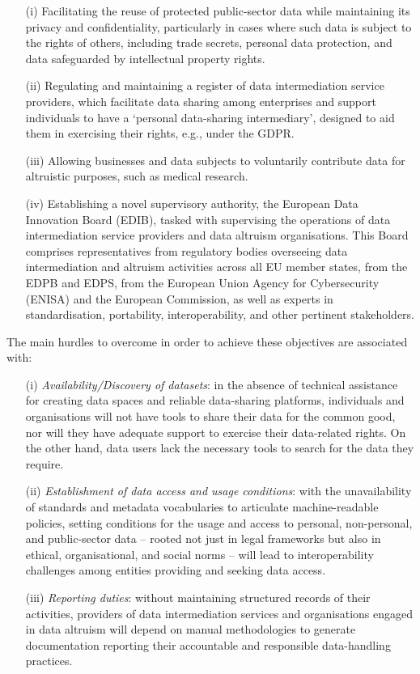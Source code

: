 \begin{enumerate}
    \item[(i)] Facilitating the reuse of protected public-sector data while maintaining its privacy and confidentiality, particularly in cases where such data is subject to the rights of others, including trade secrets, personal data protection, and data safeguarded by intellectual property rights.
    \item[(ii)] Regulating and maintaining a register of data intermediation service providers, which facilitate data sharing among enterprises and support individuals to have a `personal data-sharing intermediary', designed to aid them in exercising their rights, e.g., under the GDPR.
    \item[(iii)] Allowing businesses and data subjects to voluntarily contribute data for altruistic purposes, such as medical research.
    \item[(iv)] Establishing a novel supervisory authority, the European Data Innovation Board (EDIB), tasked with supervising the operations of data intermediation service providers and data altruism organisations.
    This Board comprises representatives from regulatory bodies overseeing data intermediation and altruism activities across all EU member states, from the EDPB and EDPS, from the European Union Agency for Cybersecurity (ENISA) and the European Commission, as well as experts in standardisation, portability, interoperability, and other pertinent stakeholders.
\end{enumerate}

The main hurdles to overcome in order to achieve these objectives are associated with:

\begin{enumerate}
    \item[(i)] \textit{Availability/Discovery of datasets}: in the absence of technical assistance for creating data spaces and reliable data-sharing platforms, individuals and organisations will not have tools to share their data for the common good, nor will they have adequate support to exercise their data-related rights. On the other hand, data users lack the necessary tools to search for the data they require.
    \item[(ii)] \textit{Establishment of data access and usage conditions}: with the unavailability of standards and metadata vocabularies to articulate machine-readable policies, setting conditions for the usage and access to personal, non-personal, and public-sector data -- rooted not just in legal frameworks but also in ethical, organisational, and social norms -- will lead to interoperability challenges among entities providing and seeking data access.
    \item[(iii)] \textit{Reporting duties}: without maintaining structured records of their activities, providers of data intermediation services and organisations engaged in data altruism will depend on manual methodologies to generate documentation reporting their accountable and responsible data-handling practices.
\end{enumerate}

